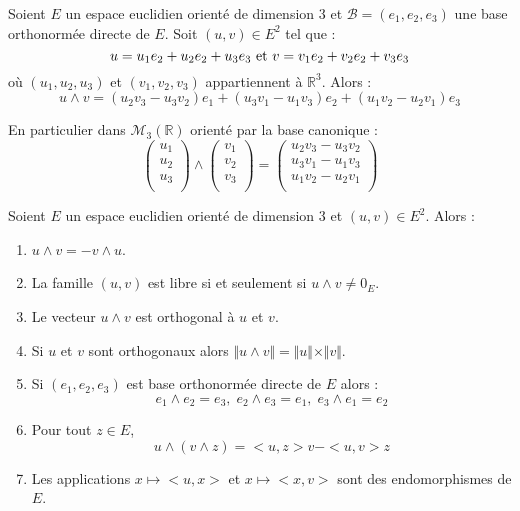 \documentclass[french,11pt,twoside]{VcCours}
\begin{document}
\begin{Proposition}{} Soient $E$ un espace euclidien orienté de dimension $3$ et $\mathcal{B}=(e_1,e_2,e_3)$ une base orthonormée directe de $E$. Soit $(u,v) \in E^2$ tel que :
$$ u= u_1 e_2 + u_2e_2 + u_3e_3 \hbox{ et } v= v_1 e_2 + v_2e_2 + v_3e_3$$
où $(u_1,u_2,u_3)$ et $(v_1,v_2,v_3)$ appartiennent à $\mathbb{R}^3$. Alors :
$$ u \wedge v = (u_2 v_3-u_3v_2) e_1 + (u_3v_1-u_1 v_3) e_2 + (u_1v_2-u_2v_1) e_3 $$
\end{Proposition}

\begin{Remarque}{} En particulier dans $\mathcal{M}_3(\mathbb{R})$ orienté par la base canonique :
$$ \begin{pmatrix}
u_1 \\
u_2 \\
u_3 \\
\end{pmatrix} \wedge  \begin{pmatrix}
v_1 \\
v_2 \\
v_3 \\
\end{pmatrix} = \begin{pmatrix}
u_2 v_3-u_3v_2 \\
u_3v_1-u_1 v_3 \\
u_1v_2-u_2v_1\\
\end{pmatrix}$$
\end{Remarque}

\begin{Demonstration}{}

\vspace{7cm}
\end{Demonstration}

\begin{Proposition}{}
Soient $E$ un espace euclidien orienté de dimension $3$ et $(u,v) \in E^2$. Alors :
\begin{enumerate}
\item $u \wedge v = - v \wedge u$.
\item La famille $(u,v)$ est libre si et seulement si $u \wedge v \neq 0_E$.
\item Le vecteur $u \wedge v$ est orthogonal à $u$ et $v$.
\item Si $u$ et $v$ sont orthogonaux alors $\Vert u \wedge v \Vert = \Vert u \Vert \times \Vert v \Vert$.
\item Si $(e_1,e_2,e_3)$ est base orthonormée directe de $E$ alors :
$$ e_1 \wedge e_2 = e_3, \; e_2 \wedge e_3 = e_1 , \; e_3 \wedge e_1 = e_2 $$
\item Pour tout $z \in E$,
$$ u \wedge (v \wedge z) =<u,z>v-<u,v>z$$
\item Les applications $x \mapsto <u,x>$ et $x \mapsto <x,v>$ sont des endomorphismes de $E$.
\end{enumerate}
\end{Proposition}
\end{document}
